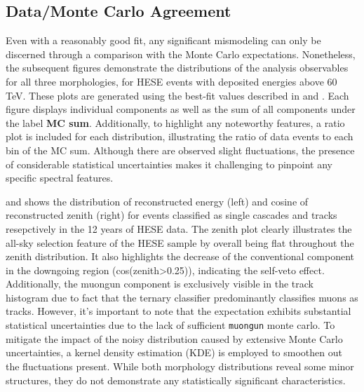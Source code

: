 \subsection{Data/Monte Carlo Agreement}
\label{sec:data_mc}
Even with a reasonably good fit, any significant mismodeling can only be discerned through a comparison with the Monte Carlo expectations. Nonetheless, the subsequent figures demonstrate the distributions of the analysis observables for all three morphologies, for HESE events with deposited energies above 60 TeV. These plots are generated using the best-fit values described in  and . Each figure displays individual components as well as the sum of all components under the label \textbf{MC sum}. Additionally, to highlight any noteworthy features, a ratio plot is included for each distribution, illustrating the ratio of data events to each bin of the MC sum. Although there are observed slight fluctuations, the presence of considerable statistical uncertainties makes it challenging to pinpoint any specific spectral features. 

 and  shows the distribution of reconstructed energy (left) and cosine of reconstructed zenith (right) for events classified as single cascades and tracks resepctively in the 12 years of HESE data. The zenith plot clearly illustrates the all-sky selection feature of the HESE sample by overall being flat throughout the zenith distribution. It also highlights the decrease of the conventional component in the downgoing region (cos(zenith>0.25)), indicating the self-veto effect. Additionally, the muongun component is exclusively visible in the track histogram due to fact that the ternary classifier predominantly classifies muons as tracks. However, it's important to note that the expectation exhibits substantial statistical uncertainties due to the lack of sufficient \texttt{muongun} monte carlo. To mitigate the impact of the noisy distribution caused by extensive Monte Carlo uncertainties, a kernel density estimation (KDE) is employed to smoothen out the fluctuations present. While both morphology distributions reveal some minor structures, they do not demonstrate any statistically significant characteristics.

